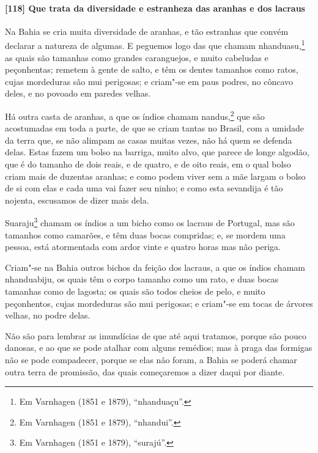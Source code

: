 \begin{linenumbers}
\paragraph{[118] Que trata da diversidade e estranheza das aranhas e dos lacraus}\quad
Na Bahia se cria muita diversidade de aranhas, e tão estranhas que convém declarar a
natureza de algumas. E peguemos logo das que chamam nhanduasu,\footnote{ Em Varnhagen (1851
e 1879), ``nhanduaçu''.} as quais são tamanhas como grandes caranguejos, e muito
cabeludas e peçonhentas; remetem à gente de salto, e têm os dentes tamanhos como ratos,
cujas mordeduras são mui perigosas; e criam"-se em paus podres, no côncavo deles, e no
povoado em paredes velhas.

Há outra casta de aranhas, a que os índios chamam nandus,\footnote{ Em Varnhagen (1851 e
1879), ``nhandui''.} que são acostumadas em toda a parte, de que se criam tantas no
Brasil, com a umidade da terra que, se não alimpam as casas muitas vezes, não há quem se
defenda delas. Estas fazem um bolso na barriga, muito alvo, que parece de longe algodão,
que é do tamanho de dois reais, e de quatro, e de oito reais, em o qual bolso criam mais
de duzentas aranhas; e como podem viver sem a mãe largam o bolso de si com elas e cada uma
vai fazer seu ninho; e como esta sevandija é tão nojenta, escusamos de dizer mais dela.

Suaraju\footnote{ Em Varnhagen (1851 e 1879), ``surajú''.} chamam os índios a um bicho
como os lacraus de Portugal, mas são tamanhos como camarões, e têm duas bocas compridas;
e, se mordem uma pessoa, está atormentada com ardor vinte e quatro horas mas não periga.

Criam"-se na Bahia outros bichos da feição dos lacraus, a que os índios chamam nhanduabiju,
os quais têm o corpo tamanho como um rato, e duas bocas tamanhas como de lagosta; os quais
são todos cheios de pelo, e muito peçonhentos, cujas mordeduras são mui perigosas; e
criam"-se em tocas de árvores velhas, no podre delas.

Não são para lembrar as imundícias de que até aqui tratamos, porque são pouco danosas, e
ao que se pode atalhar com alguns remédios; mas à praga das formigas não se pode
compadecer, porque se elas não foram, a Bahia se poderá chamar outra terra de promissão,
das quais começaremos a dizer daqui por diante.


\end{linenumbers}

